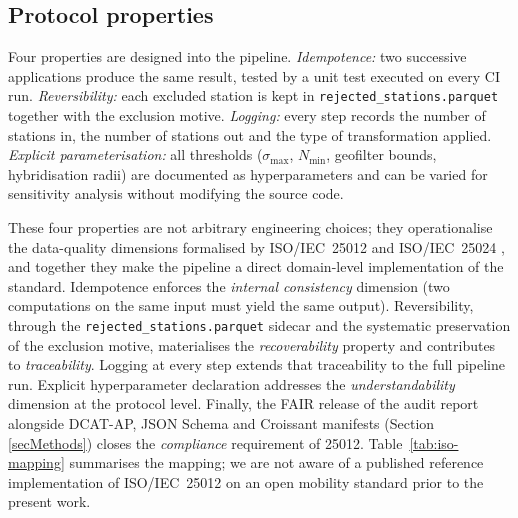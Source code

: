 \documentclass[11pt,a4paper]{article}
\begin{document}
\subsection{Protocol properties}
Four properties are designed into the pipeline. \emph{Idempotence:} two
successive applications produce the same result, tested by a unit test
executed on every CI run. \emph{Reversibility:} each excluded station
is kept in \texttt{rejected\_stations.parquet} together with the
exclusion motive. \emph{Logging:} every step records the number of
stations in, the number of stations out and the type of transformation
applied. \emph{Explicit parameterisation:} all thresholds
($\sigma_{\max}$, $N_{\min}$, geofilter bounds, hybridisation radii)
are documented as hyperparameters and can be varied for sensitivity
analysis without modifying the source code.

These four properties are not arbitrary engineering choices; they
operationalise the data-quality dimensions formalised by
ISO/IEC~25012 \cite{ISO25012} and ISO/IEC~25024 \cite{ISO25024}, and
together they make the pipeline a direct domain-level implementation
of the standard. Idempotence enforces the
\emph{internal consistency} dimension (two computations on the same
input must yield the same output). Reversibility, through the
\texttt{rejected\_stations.parquet} sidecar and the systematic
preservation of the exclusion motive, materialises the
\emph{recoverability} property and contributes to
\emph{traceability}. Logging at every step extends that traceability
to the full pipeline run. Explicit hyperparameter declaration
addresses the \emph{understandability} dimension at the protocol
level. Finally, the FAIR release of the audit report alongside
DCAT-AP, JSON Schema and Croissant manifests (Section
\ref{secMethods}) closes the \emph{compliance} requirement of
25012. Table~\ref{tab:iso-mapping} summarises the mapping; we are
not aware of a published reference implementation of ISO/IEC~25012
on an open mobility standard prior to the present work.
\end{document}
